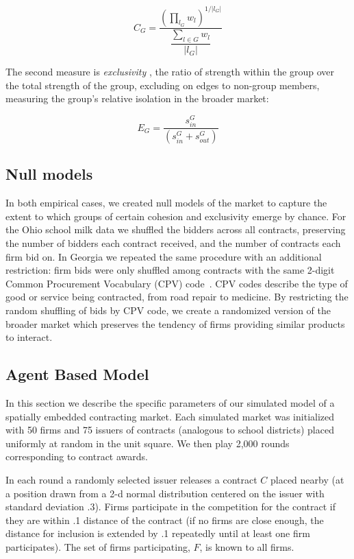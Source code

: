 $$C_{G}=\dfrac{\displaystyle \left(\prod_{l_{G}}w_{l}\right)^{1/\lvert l_{G}\rvert}}{\dfrac{\displaystyle \sum_{l \in G}w_{l}}{\lvert l_{G}\rvert}}$$

The second measure is \textit{exclusivity} , the ratio of strength within the group over the total strength of the group, excluding on edges to non-group members, measuring the group's relative isolation in the broader market:

$$E_{G}= \frac{s_{in}^{G}}{\left(s_{in}^{G}+s_{out}^{G}\right)}$$

\subsection{Null models}
In both empirical cases, we created null models of the market to capture the extent to which groups of certain cohesion and exclusivity emerge by chance. For the Ohio school milk data we shuffled the bidders across all contracts, preserving the number of bidders each contract received, and the number of contracts each firm bid on. In Georgia we repeated the same procedure with an additional restriction: firm bids were only shuffled among contracts with the same 2-digit Common Procurement Vocabulary (CPV) code~\cite{cpvreport}. CPV codes describe the type of good or service being contracted, from road repair to medicine. By restricting the random shuffling of bids by CPV code, we create a randomized version of the broader market which preserves the tendency of firms providing similar products to interact.

\subsection{Agent Based Model}
In this section we describe the specific parameters of our simulated model of a spatially embedded contracting market. Each simulated market was initialized with 50 firms and 75 issuers of contracts (analogous to school districts) placed uniformly at random in the unit square. We then play 2,000 rounds corresponding to contract awards.

In each round a randomly selected issuer releases a contract $C$ placed nearby (at a position drawn from a 2-d normal distribution centered on the issuer with standard deviation .3). Firms participate in the competition for the contract if they are within .1 distance of the contract (if no firms are close enough, the distance for inclusion is extended by .1 repeatedly until at least one firm participates). The set of firms participating, $F$, is known to all firms.

